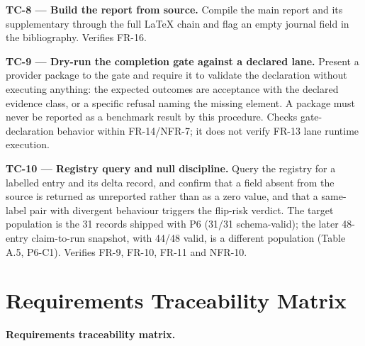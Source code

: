 \documentclass[12pt,a4paper]{report}
\begin{document}
\textbf{TC-8 --- Build the report from source.} Compile the main report
and its supplementary through the full LaTeX chain and flag an empty
journal field in the bibliography. Verifies FR-16.

\textbf{TC-9 --- Dry-run the completion gate against a declared lane.}
Present a provider package to the gate and require it to validate the
declaration without executing anything: the expected outcomes are
acceptance with the declared evidence class, or a specific refusal
naming the missing element. A package must never be reported as a
benchmark result by this procedure. Checks gate-declaration behavior
within FR-14/NFR-7; it does not verify FR-13 lane runtime execution.

\textbf{TC-10 --- Registry query and null discipline.} Query the
registry for a labelled entry and its delta record, and confirm that a
field absent from the source is returned as unreported rather than as a
zero value, and that a same-label pair with divergent behaviour triggers
the flip-risk verdict. The target population is the 31 records shipped
with P6 (31/31 schema-valid); the later 48-entry claim-to-run snapshot,
with 44/48 valid, is a different population (Table A.5, P6-C1). Verifies
FR-9, FR-10, FR-11 and NFR-10.

\section{Requirements Traceability
Matrix}\label{requirements-traceability-matrix}

\textbf{Requirements traceability matrix.}
\end{document}
